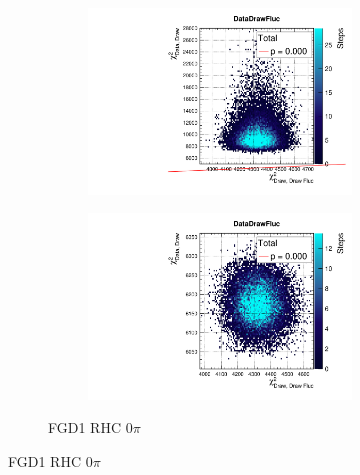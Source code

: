 \begin{figure}[h]
\begin{subfigure}[t]{\textwidth}
\begin{subfigure}[t]{0.24\textwidth}
		\end{subfigure}
		\begin{subfigure}[t]{0.24\textwidth}
			\includegraphics[width=\textwidth, trim={0mm 0mm 0mm 8mm}, clip,page=119]{figures/mach3/2018/data/2018a_FixedCov_RedCov_Mpi_Data_merge_PriorPred_procs}
		\end{subfigure}
		\begin{subfigure}[t]{0.24\textwidth}
			\includegraphics[width=\textwidth, trim={0mm 0mm 0mm 8mm}, clip,page=119]{figures/mach3/2018/data/2018a_FixedCov_RedCov_Mpi_Data_merge_PostPredStore_FullLLH_procs}
		\end{subfigure}
		\caption{FGD1 \numu RHC 0$\pi$}
	\end{subfigure}
	

\end{figure}
